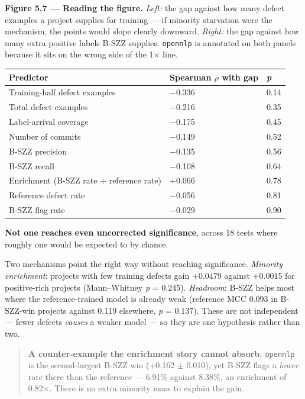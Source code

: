 \textbf{Figure 5.7 --- Reading the figure.} \emph{Left:} the gap against
how many defect examples a project supplies for training --- if minority
starvation were the mechanism, the points would slope clearly downward.
\emph{Right:} the gap against how many extra positive labels B-SZZ
supplies. \texttt{opennlp} is annotated on both panels because it sits
on the wrong side of the 1\ensuremath{\times} line.

\begin{longtable}[]{@{}lll@{}}
\toprule\noalign{}
Predictor & Spearman \ensuremath{\rho} with gap & \emph{p} \\
\midrule\noalign{}
\endhead
\bottomrule\noalign{}
\endlastfoot
Training-half defect examples & \ensuremath{-}0.336 & 0.14 \\
Total defect examples & \ensuremath{-}0.216 & 0.35 \\
Label-arrival coverage & \ensuremath{-}0.175 & 0.45 \\
Number of commits & \ensuremath{-}0.149 & 0.52 \\
B-SZZ precision & \ensuremath{-}0.135 & 0.56 \\
B-SZZ recall & \ensuremath{-}0.108 & 0.64 \\
Enrichment (B-SZZ rate \ensuremath{\div} reference rate) & +0.066 & 0.78 \\
Reference defect rate & \ensuremath{-}0.056 & 0.81 \\
B-SZZ flag rate & \ensuremath{-}0.029 & 0.90 \\
\end{longtable}

\textbf{Not one reaches even uncorrected significance}, across 18 tests
where roughly one would be expected to by chance.

Two mechanisms point the right way without reaching significance.
\emph{Minority enrichment}: projects with few training defects gain
+0.0479 against +0.0015 for positive-rich projects (Mann--Whitney
\emph{p} = 0.245). \emph{Headroom}: B-SZZ helps most where the
reference-trained model is already weak (reference MCC 0.093 in
B-SZZ-win projects against 0.119 elsewhere, \emph{p} = 0.137). These are
not independent --- fewer defects \emph{causes} a weaker model --- so
they are one hypothesis rather than two.

\begin{quote}
\textbf{A counter-example the enrichment story cannot absorb.}
\texttt{opennlp} is the second-largest B-SZZ win (+0.162 \ensuremath{\pm} 0.010), yet
B-SZZ flags a \emph{lower} rate there than the reference --- 6.91\%
against 8.38\%, an enrichment of 0.82\ensuremath{\times}. There is no extra minority mass
to explain the gain.
\end{quote}

